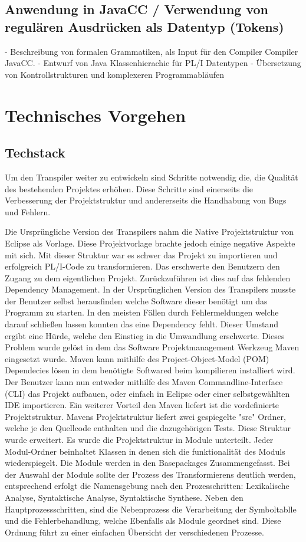 	\subsection{Anwendung in JavaCC / Verwendung von regulären Ausdrücken als Datentyp (Tokens)}
     - Beschreibung von formalen Grammatiken, als Input für den Compiler Compiler JavaCC.
     - Entwurf von Java Klassenhierachie für PL/I Datentypen
     - Übersetzung von Kontrollstrukturen und komplexeren Programmabläufen


\section{Technisches Vorgehen}
\subsection{Techstack}
Um den Transpiler weiter zu entwickeln sind Schritte notwendig die, die Qualität des bestehenden Projektes erhöhen. Diese Schritte sind einerseits die Verbesserung der Projektstruktur und andererseits die Handhabung von Bugs und Fehlern.

Die Ursprüngliche Version des Transpilers nahm die Native Projektstruktur von Eclipse als Vorlage. Diese Projektvorlage brachte jedoch einige negative Aspekte mit sich. Mit dieser Struktur war es schwer das Projekt zu importieren und erfolgreich PL/I-Code zu transformieren. Das erschwerte den Benutzern den Zugang zu dem eigentlichen Projekt. 
Zurückzuführen ist dies auf das fehlenden Dependency Management. In der Ursprünglichen Version des Transpilers musste der Benutzer selbst herausfinden welche Software dieser benötigt um das Programm zu starten. In den meisten Fällen durch Fehlermeldungen welche darauf schließen lassen konnten das eine Dependency fehlt. Dieser Umstand ergibt eine Hürde, welche den Einstieg in die Umwandlung erschwerte. 
Dieses Problem wurde gelöst in dem das Software Projektmanagement Werkzeug Maven eingesetzt wurde. Maven kann mithilfe des Project-Object-Model (POM) Dependecies lösen in dem benötigte Softwared beim kompilieren installiert wird. Der Benutzer kann nun entweder mithilfe des Maven Commandline-Interface (CLI) das Projekt aufbauen, oder einfach in Eclipse oder einer selbstgewählten IDE importieren.
Ein weiterer Vorteil den Maven liefert ist die vordefinierte Projektstruktur. Mavens Projektstruktur liefert zwei gespiegelte "src" Ordner, welche je den Quellcode enthalten und die dazugehörigen Tests. Diese Struktur wurde erweitert. Es wurde die Projektstruktur in Module unterteilt. Jeder Modul-Ordner beinhaltet Klassen in denen sich die funktionalität des Moduls wiederspiegelt. Die Module werden in den Basepackages Zusammengefasst. Bei der Auswahl der Module sollte der Prozess des Transformierens deutlich werden, entsprechend erfolgt die Namensgebung nach den Prozesschritten: Lexikalische Analyse, Syntaktische Analyse, Syntaktische Synthese. Neben den Hauptprozessschritten, sind die Nebenprozess die Verarbeitung der Symboltablle und die Fehlerbehandlung, welche Ebenfalls als Module geordnet sind. Diese Ordnung führt zu einer einfachen Übersicht der verschiedenen Prozesse.

